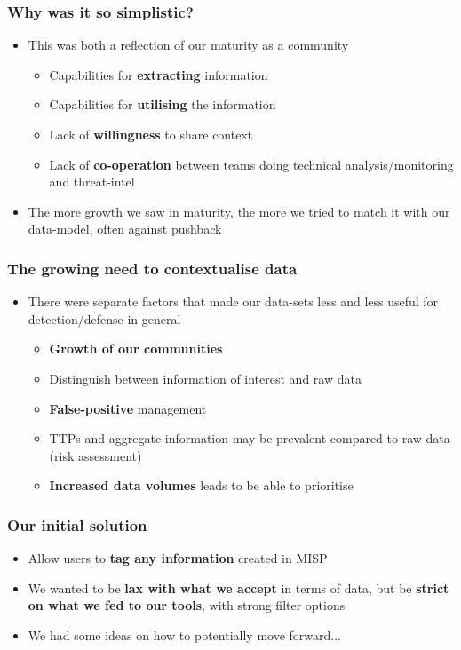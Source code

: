 \begin{frame}
  \frametitle{Why was it so simplistic?}
  \begin{itemize}
    \item This was both a reflection of our maturity as a community
    \begin{itemize}
      \item Capabilities for {\bf extracting} information
      \item Capabilities for {\bf utilising} the information
      \item Lack of {\bf willingness} to share context
      \item Lack of {\bf co-operation} between teams doing technical analysis/monitoring and threat-intel
    \end{itemize}
    \item The more growth we saw in maturity, the more we tried to match it with our data-model, often against pushback
  \end{itemize}
\end{frame}

\begin{frame}
\frametitle{The growing need to contextualise data}
\begin{itemize}
       \item There were separate factors that made our data-sets less and less useful for detection/defense in general
        \begin{itemize}
                \item {\bf Growth of our communities}
                \item Distinguish between information of interest and raw data
                \item {\bf False-positive} management
                \item TTPs and aggregate information may be prevalent compared to raw data (risk assessment)
                \item {\bf Increased data volumes} leads to be able to prioritise
        \end{itemize}
\end{itemize}
\end{frame}

\begin{frame}
\frametitle{Our initial solution}
\begin{itemize}
       \item Allow users to {\bf tag any information} created in MISP
       \item We wanted to be {\bf lax with what we accept} in terms of data, but be {\bf strict on what we fed to our tools}, with strong filter options
       \item We had some ideas on how to potentially move forward...
\end{itemize}
\end{frame}

